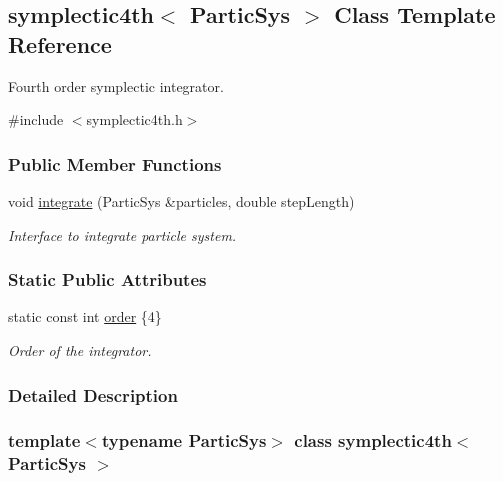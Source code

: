 \hypertarget{classsymplectic4th}{}\subsection{symplectic4th$<$ Partic\+Sys $>$ Class Template Reference}
\label{classsymplectic4th}


Fourth order symplectic integrator.  




{\ttfamily \#include $<$symplectic4th.\+h$>$}

\subsubsection*{Public Member Functions}
\begin{DoxyCompactItemize}
\item 
void \mbox{\hyperlink{classsymplectic4th_aa4fc1444804ed2effb0033a3cb5056e4}{integrate}} (Partic\+Sys \&particles, double step\+Length)
\begin{DoxyCompactList}\small\item\em Interface to integrate particle system. \end{DoxyCompactList}\end{DoxyCompactItemize}
\subsubsection*{Static Public Attributes}
\begin{DoxyCompactItemize}
\item 
static const int \mbox{\hyperlink{classsymplectic4th_a44427b7e9dab1a2241071d1cc639ebe4}{order}} \{4\}
\begin{DoxyCompactList}\small\item\em Order of the integrator. \end{DoxyCompactList}\end{DoxyCompactItemize}


\subsubsection{Detailed Description}
\subsubsection*{template$<$typename Partic\+Sys$>$\newline
class symplectic4th$<$ Partic\+Sys $>$}

